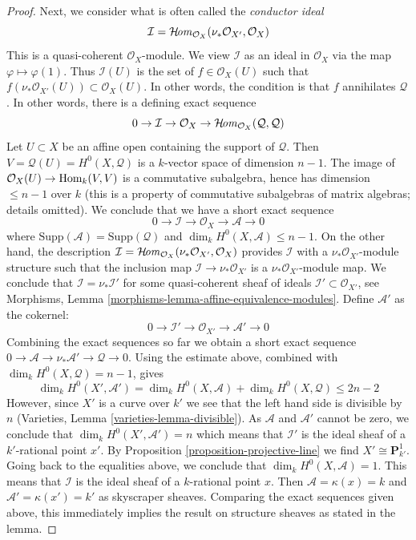 \begin{proof}
\medskip\noindent
Next, we consider what is often called the {\it conductor ideal}
$$
\mathcal{I} = \mathop{\mathcal{H}\!\mathit{om}}\nolimits_{\mathcal{O}_X}(\nu_*\mathcal{O}_{X'}, \mathcal{O}_X)
$$
This is a quasi-coherent $\mathcal{O}_X$-module. We view $\mathcal{I}$
as an ideal in $\mathcal{O}_X$ via the map $\varphi \mapsto \varphi(1)$.
Thus $\mathcal{I}(U)$ is the set of $f \in \mathcal{O}_X(U)$ such that
$f \left(\nu_*\mathcal{O}_{X'}(U)\right) \subset \mathcal{O}_X(U)$. In
other words, the condition is that $f$ annihilates $\mathcal{Q}$.
In other words, there is a defining exact sequence
$$
0 \to \mathcal{I} \to \mathcal{O}_X \to
\mathop{\mathcal{H}\!\mathit{om}}\nolimits_{\mathcal{O}_X}(\mathcal{Q}, \mathcal{Q})
$$
Let $U \subset X$ be an affine open containing the support of $\mathcal{Q}$.
Then $V = \mathcal{Q}(U) = H^0(X, \mathcal{Q})$ is a $k$-vector space
of dimension $n - 1$. The image of
$\mathcal{O}_X(U) \to \mathop{\mathrm{Hom}}\nolimits_k(V, V)$ is a commutative subalgebra,
hence has dimension $\leq n - 1$ over $k$ (this is a property of
commutative subalgebras of matrix algebras; details omitted).
We conclude that we have a short exact sequence
$$
0 \to \mathcal{I} \to \mathcal{O}_X \to \mathcal{A} \to 0
$$
where $\text{Supp}(\mathcal{A}) = \text{Supp}(\mathcal{Q})$
and $\dim_k H^0(X, \mathcal{A}) \leq n - 1$.
On the other hand, the description
$\mathcal{I} = \mathop{\mathcal{H}\!\mathit{om}}\nolimits_{\mathcal{O}_X}(\nu_*\mathcal{O}_{X'}, \mathcal{O}_X)$
provides $\mathcal{I}$ with a $\nu_*\mathcal{O}_{X'}$-module structure
such that the inclusion map $\mathcal{I} \to \nu_*\mathcal{O}_{X'}$
is a $\nu_*\mathcal{O}_{X'}$-module map.
We conclude that $\mathcal{I} = \nu_*\mathcal{I}'$
for some quasi-coherent sheaf of ideals
$\mathcal{I}' \subset \mathcal{O}_{X'}$, see
Morphisms, Lemma \ref{morphisms-lemma-affine-equivalence-modules}.
Define $\mathcal{A}'$ as the cokernel:
$$
0 \to \mathcal{I}' \to \mathcal{O}_{X'} \to \mathcal{A}' \to 0
$$
Combining the exact sequences so far we obtain a short exact sequence
$0 \to \mathcal{A} \to \nu_*\mathcal{A}' \to \mathcal{Q} \to 0$.
Using the estimate above,
combined with $\dim_k H^0(X, \mathcal{Q}) = n - 1$, gives
$$
\dim_k H^0(X', \mathcal{A}') =
\dim_k H^0(X, \mathcal{A}) + \dim_k H^0(X, \mathcal{Q}) \leq 2 n - 2
$$
However, since $X'$ is a curve over $k'$ we see that
the left hand side is divisible by $n$
(Varieties, Lemma \ref{varieties-lemma-divisible}).
As $\mathcal{A}$ and $\mathcal{A}'$ cannot be zero, we conclude that
$\dim_k H^0(X', \mathcal{A}') = n$ which means that $\mathcal{I}'$
is the ideal sheaf of a $k'$-rational point $x'$.
By Proposition \ref{proposition-projective-line}
we find $X' \cong \mathbf{P}^1_{k'}$.
Going back to the equalities above, we conclude that
$\dim_k H^0(X, \mathcal{A}) = 1$. This
means that $\mathcal{I}$ is the ideal sheaf of a
$k$-rational point $x$. Then $\mathcal{A} = \kappa(x) = k$
and $\mathcal{A}' = \kappa(x') = k'$ as skyscraper sheaves.
Comparing the exact sequences given above,
this immediately implies the result on structure sheaves
as stated in the lemma.
\end{proof}


